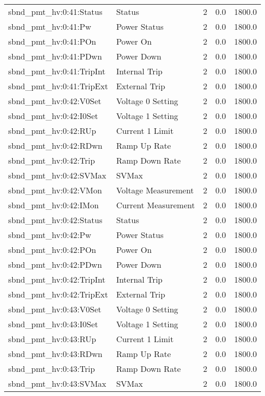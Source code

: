 \begin{center}
\begin{longtable}{l | l l l l }
sbnd\_pmt\_hv:0:41:Status & Status & 2 & 0.0 & 1800.0\\ 
sbnd\_pmt\_hv:0:41:Pw & Power Status & 2 & 0.0 & 1800.0\\ 
sbnd\_pmt\_hv:0:41:POn & Power On & 2 & 0.0 & 1800.0\\ 
sbnd\_pmt\_hv:0:41:PDwn & Power Down & 2 & 0.0 & 1800.0\\ 
sbnd\_pmt\_hv:0:41:TripInt & Internal Trip & 2 & 0.0 & 1800.0\\ 
sbnd\_pmt\_hv:0:41:TripExt & External Trip & 2 & 0.0 & 1800.0\\ 
sbnd\_pmt\_hv:0:42:V0Set & Voltage 0 Setting & 2 & 0.0 & 1800.0\\ 
sbnd\_pmt\_hv:0:42:I0Set & Voltage 1 Setting & 2 & 0.0 & 1800.0\\ 
sbnd\_pmt\_hv:0:42:RUp & Current 1 Limit & 2 & 0.0 & 1800.0\\ 
sbnd\_pmt\_hv:0:42:RDwn & Ramp Up Rate & 2 & 0.0 & 1800.0\\ 
sbnd\_pmt\_hv:0:42:Trip & Ramp Down Rate & 2 & 0.0 & 1800.0\\ 
sbnd\_pmt\_hv:0:42:SVMax & SVMax & 2 & 0.0 & 1800.0\\ 
sbnd\_pmt\_hv:0:42:VMon & Voltage Measurement & 2 & 0.0 & 1800.0\\ 
sbnd\_pmt\_hv:0:42:IMon & Current Measurement & 2 & 0.0 & 1800.0\\ 
sbnd\_pmt\_hv:0:42:Status & Status & 2 & 0.0 & 1800.0\\ 
sbnd\_pmt\_hv:0:42:Pw & Power Status & 2 & 0.0 & 1800.0\\ 
sbnd\_pmt\_hv:0:42:POn & Power On & 2 & 0.0 & 1800.0\\ 
sbnd\_pmt\_hv:0:42:PDwn & Power Down & 2 & 0.0 & 1800.0\\ 
sbnd\_pmt\_hv:0:42:TripInt & Internal Trip & 2 & 0.0 & 1800.0\\ 
sbnd\_pmt\_hv:0:42:TripExt & External Trip & 2 & 0.0 & 1800.0\\ 
sbnd\_pmt\_hv:0:43:V0Set & Voltage 0 Setting & 2 & 0.0 & 1800.0\\ 
sbnd\_pmt\_hv:0:43:I0Set & Voltage 1 Setting & 2 & 0.0 & 1800.0\\ 
sbnd\_pmt\_hv:0:43:RUp & Current 1 Limit & 2 & 0.0 & 1800.0\\ 
sbnd\_pmt\_hv:0:43:RDwn & Ramp Up Rate & 2 & 0.0 & 1800.0\\ 
sbnd\_pmt\_hv:0:43:Trip & Ramp Down Rate & 2 & 0.0 & 1800.0\\ 
sbnd\_pmt\_hv:0:43:SVMax & SVMax & 2 & 0.0 & 1800.0\\ 

\end{longtable}
\end{center}
